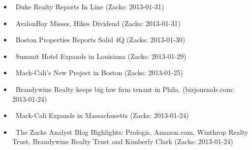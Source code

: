 \documentclass[11pt,asymmetric]{article}
\begin{document}
\begin{itemize}
\item\ Duke Realty Reports In Line (Zacks: 2013-01-31)
\item\ AvalonBay Misses, Hikes Dividend (Zacks: 2013-01-31)
\item\ Boston Properties Reports Solid 4Q (Zacks: 2013-01-30)
\item\ Summit Hotel Expands in Louisiana (Zacks: 2013-01-29)
\item\ Mack-Cali's New Project in Boston (Zacks: 2013-01-25)
\item\ Brandywine Realty keeps big law firm tenant in Phila. (bizjournals.com: 2013-01-24)
\item\ Mack-Cali Expands in Massachusetts (Zacks: 2013-01-24)
\item\ The Zacks Analyst Blog Highlights: Prologis, Amazon.com, Winthrop Realty Trust, Brandywine Realty Trust and Kimberly Clark (Zacks: 2013-01-24)
\end{itemize}
\end{document}
